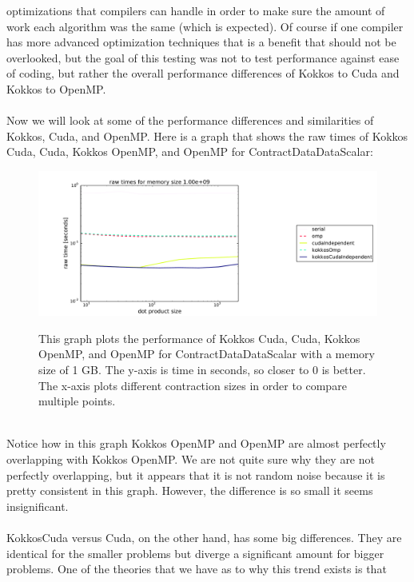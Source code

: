 optimizations that compilers can handle in order to make sure the amount of work
each algorithm was the same (which is expected). Of course if one compiler has
more advanced optimization techniques that is a benefit that should not be
overlooked, but the goal of this testing was not to test performance against
ease of coding, but rather the overall performance differences of Kokkos to 
Cuda and Kokkos to OpenMP. \\
\\
Now we will look at some of the performance differences and similarities of
Kokkos, Cuda, and OpenMP. Here is a graph that shows the raw times of Kokkos
Cuda, Cuda, Kokkos OpenMP, and OpenMP for ContractDataDataScalar: \\
\begin{figure}[!ht]
{\includegraphics[scale=.4]{CDDS_RawTimes_2d_largestSize_Comparison.pdf}}
\caption[ContractDataDataScalar Kokkos performance comparison]{This graph plots the performance of Kokkos Cuda, Cuda, Kokkos OpenMP,
and OpenMP for ContractDataDataScalar with a memory size of 1 GB. 
The y-axis is time in
seconds, so closer to 0 is better. The x-axis plots different contraction sizes
in order to compare multiple points.}
\label{fig:ContractDataDataScalar Kokkos performance comparison}
\end{figure} \\
Notice how in this graph Kokkos OpenMP and OpenMP are almost perfectly
overlapping with Kokkos OpenMP. We are not quite sure why they are not perfectly
overlapping, but it appears that it is not random noise because it is pretty
consistent in this graph. However, the difference is so small it seems
insignificant. \\
\\
KokkosCuda versus Cuda, on the other hand, has some big differences. They are
identical for the smaller problems but diverge a significant amount for bigger
problems. One of the theories that we have as to why this trend exists is that
